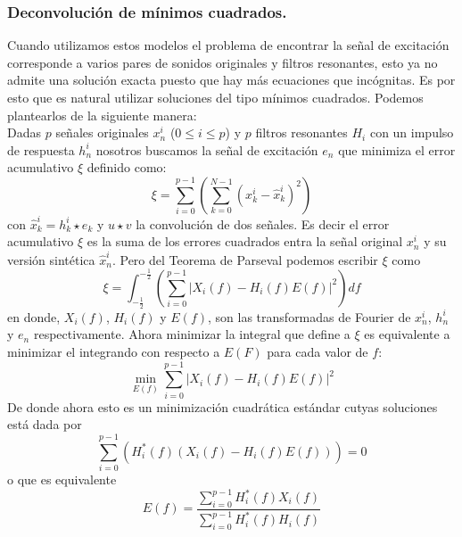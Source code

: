 \documentclass[11pt]{amsart}
\theoremstyle{plain}
\theoremstyle{definition}
\begin{document}
\subsubsection{Deconvolución de mínimos cuadrados.} Cuando utilizamos estos modelos el problema de encontrar la señal de excitación corresponde a varios pares de sonidos originales y filtros resonantes, esto ya no admite una solución exacta puesto que hay más ecuaciones que incógnitas. Es por esto que es natural utilizar soluciones del tipo mínimos cuadrados. Podemos plantearlos de la siguiente manera: \\
Dadas $p$ señales originales $x_n^{i}$ ($0 \leq i \leq p$) y $p$ filtros resonantes $H_i$ con un impulso de respuesta $h_n^{i}$ nosotros buscamos la señal de excitación $e_n$ que minimiza el error acumulativo $\xi$ definido como:
$$
\xi=\sum_{i=0}^{p-1}\left( \sum_{k=0}^{N-1}(x_k^{i}-\hat{x}_k^{i})^2 \right)
$$
con $\hat{x}_k^{i}=h_k^{i} \star e_k$ y $u \star v$ la convolución de dos señales. Es decir el error acumulativo $\xi$ es la suma de los errores cuadrados entra la señal original $x_n^{i}$ y su versión sintética $\hat{x}_n^{i}$. Pero del Teorema de Parseval podemos escribir $\xi$ como
$$
\xi=\int_{-\frac{1}{2}}^{-\frac{1}{2}}\left( \sum_{i=0}^{p-1} | X_i(f)-H_i(f)E(f)|^2\right)df
$$
en donde, $X_i(f)$, $H_i(f)$ y $E(f)$, son las transformadas de Fourier de $x_n^i$, $h_n^i$ y $e_n$ respectivamente. Ahora minimizar la integral que define a $\xi$ es equivalente a minimizar el integrando con respecto a $E(F)$ para cada valor de $f$:
$$
\min_{E(f)}\sum_{i=0}^{p-1}|X_i(f)-H_i(f)E(f)|^2
$$
De donde ahora esto es un minimización cuadrática estándar cutyas soluciones está dada por 
$$
\sum_{i=0}^{p-1}(H_i^*(f)(X_i(f)-H_i(f)E(f)))=0
$$
o que es equivalente
$$
E(f)=\dfrac{\sum_{i=0}^{p-1}H_i^*(f)X_i(f)}{\sum_{i=0}^{p-1}H_i^*(f)H_i(f)}
$$


\begin{footnotesize}


\end{footnotesize}
\end{document}
